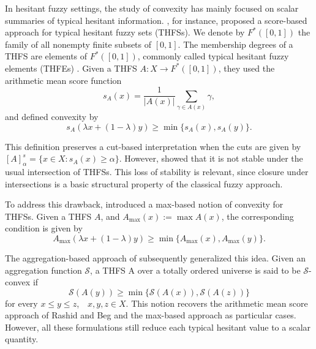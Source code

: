 \documentclass[11pt,a4paper]{article}
\begin{document}
In hesitant fuzzy settings, the study of convexity has mainly focused on scalar summaries of typical hesitant information. \citet{RashidBeg2016}, for instance, proposed a score-based approach for typical hesitant fuzzy sets (THFSs). We denote by \(F^*([0,1])\) the family of all nonempty finite subsets of \([0,1]\). The membership degrees of a THFS are elements of \(F^*([0,1])\), commonly called typical hesitant fuzzy elements (THFEs) \cite[Def.~3.1]{Bedregal2014}. Given a THFS \(A:X\to F^*([0,1])\), they used the arithmetic mean score function \citep{Farhadinia2014,XuXia2011}
\begin{equation}\label{eq:arithmetic-mean-score}
s_A(x)=\frac{1}{|A(x)|}\sum_{\gamma\in A(x)}\gamma,
\end{equation}
and defined convexity by
\begin{equation}\label{eq:score-based-thfs-convexity}
s_A(\lambda x+(1-\lambda)y)
\geq
\min\{s_A(x),s_A(y)\}.
\end{equation}

This definition preserves a cut-based interpretation when the cuts are given by \([A]^s_\alpha=\{x\in X:s_A(x)\geq \alpha\}\). However, \citet{JanisMontesRencova2018} showed that it is not stable under the usual intersection of THFSs. This loss of stability is relevant, since closure under intersections is a basic structural property of the classical fuzzy approach.

\smallskip

To address this drawback, \citet{JanisMontesRencova2018} introduced a max-based notion of convexity for THFSs. Given a THFS \(A\), and \(A_{\max}(x):=\max A(x)\), the corresponding condition is given by
\begin{equation}\label{eq:max-based-thfs-convexity}
A_{\max}(\lambda x+(1-\lambda)y)
\geq
\min\{A_{\max}(x),A_{\max}(y)\}.
\end{equation}

The aggregation-based approach of \citet{Huidobro2021} subsequently generalized this idea. Given an aggregation function \(\mathcal S\), a THFS A over a totally ordered universe is said to be \(\mathcal S\)-convex if
\begin{equation}\label{eq:aggregation-based-thfs-convexity}
\mathcal S(A(y))
\geq
\min\{\mathcal S(A(x)),\mathcal S(A(z))\}
\end{equation}
for every \(x\leq y\leq z\),~~\(x,y,z\in X\). This notion recovers the arithmetic mean score approach of Rashid and Beg and the max-based approach as particular cases. However, all these formulations still reduce each typical hesitant value to a scalar quantity.
\end{document}
